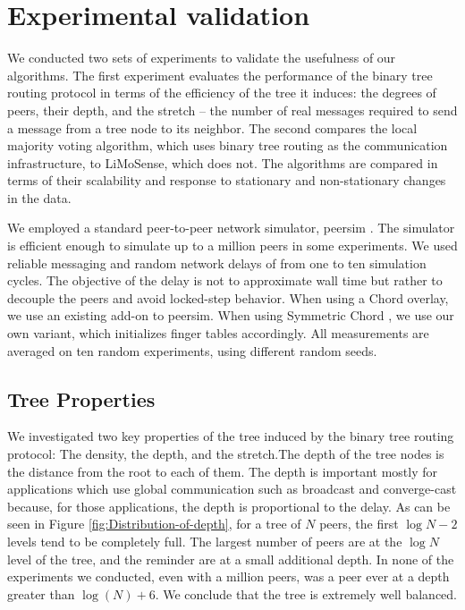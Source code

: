 \documentclass[12pt,english,journal]{elsarticle}
\numberwithin{equation}{section}
\numberwithin{figure}{section}
\theoremstyle{plain}
\theoremstyle{plain}
\begin{document}
\section{\label{sec:Experimentation}Experimental validation}

We conducted two sets of experiments to validate the usefulness of
our algorithms. The first experiment evaluates the performance of
the binary tree routing protocol in terms of the efficiency of the
tree it induces: the degrees of peers, their depth, and the stretch
-- the number of real messages required to send a message from a tree
node to its neighbor. The second compares the local majority voting
algorithm, which uses binary tree routing as the communication infrastructure,
to LiMoSense, which does not. The algorithms are compared in terms
of their scalability and response to stationary and non-stationary
changes in the data. 

We employed a standard peer-to-peer network simulator, peersim \citep{peersim}.
The simulator is efficient enough to simulate up to a million peers
in some experiments. We used reliable messaging and random network
delays of from one to ten simulation cycles. The objective of the
delay is not to approximate wall time but rather to decouple the peers
and avoid locked-step behavior. When using a Chord overlay, we use
an existing add-on to peersim. When using Symmetric Chord \citep{SChord},
we use our own variant, which initializes finger tables accordingly.
All measurements are averaged on ten random experiments, using different
random seeds. 


\subsection{Tree Properties}

We investigated two key properties of the tree induced by the binary
tree routing protocol: The density, the depth, and the stretch.The
depth of the tree nodes is the distance from the root to each of them.
The depth is important mostly for applications which use global communication
such as broadcast and converge-cast because, for those applications,
the depth is proportional to the delay. As can be seen in Figure \ref{fig:Distribution-of-depth},
for a tree of $N$ peers, the first $\log N-2$ levels tend to be
completely full. The largest number of peers are at the $\log N$
level of the tree, and the reminder are at a small additional depth.
In none of the experiments we conducted, even with a million peers,
was a peer ever at a depth greater than $\log\left(N\right)+6$. We
conclude that the tree is extremely well balanced.
\end{document}
